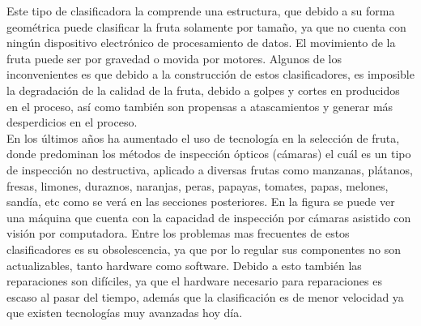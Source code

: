\documentclass[twoside,spanish,ESP,MSc]{plantillaLabUPV}
\theoremstyle{definition}
\begin{document}

 Este tipo de clasificadora %
la comprende una estructura, que debido a su forma geométrica puede clasificar la fruta solamente por tamaño, ya que no cuenta con ningún dispositivo electrónico de procesamiento de datos. El movimiento de la fruta puede ser por gravedad o movida por motores. Algunos de los inconvenientes es que debido a la construcción de estos clasificadores, es imposible la degradación de la calidad de la fruta, debido a golpes y cortes en producidos en el proceso, así como también son propensas a atascamientos y generar más desperdicios en el proceso.\\



 En los últimos años ha aumentado el uso de tecnología en la selección de fruta, donde predominan los métodos de inspección ópticos (cámaras) el cuál es un tipo de inspección no destructiva, aplicado a diversas frutas como manzanas, plátanos, fresas, limones, duraznos, naranjas, peras, papayas, tomates, papas, melones, sandía, etc como se verá en las secciones posteriores. En la figura %
se puede ver una máquina que cuenta con la capacidad de inspección por cámaras asistido con visión por computadora. Entre los problemas mas frecuentes de estos clasificadores es su obsolescencia, ya que por lo regular sus componentes no son actualizables, tanto hardware como software. Debido a esto también las reparaciones son difíciles, ya que el hardware necesario para reparaciones es escaso al pasar del tiempo, además que la clasificación es de menor velocidad ya que existen tecnologías muy avanzadas hoy día.\\
	
	
\end{document}
